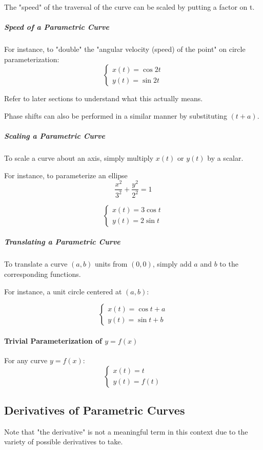 \documentclass{article}
\begin{document}
The "speed" of the traversal of the curve can be scaled by putting a factor on t.

\subparagraph{Speed of a Parametric Curve}
For instance, to "double" the "angular velocity (speed) of the point" on circle parameterization:
\[
    \begin{cases}
        x(t) = \cos 2t \\
        y(t) = \sin 2t
    \end{cases}
\]

Refer to later sections to understand what this actually means.

Phase shifts can also be performed in a similar manner by substituting $(t+a)$.

\subparagraph{Scaling a Parametric Curve}
To scale a curve about an axis, simply multiply $x(t)$ or $y(t)$ by a scalar.

For instance, to parameterize an ellipse
$$\frac{x^2}{3^2} + \frac{y^2}{2^2} = 1$$

\[
    \begin{cases}
        x(t) = 3 \cos t \\
        y(t) = 2 \sin t
    \end{cases}
\]

\subparagraph{Translating a Parametric Curve}
To translate a curve $(a,b)$ units from $(0,0)$, simply add $a$ and $b$ to the corresponding functions.

For instance, a unit circle centered at $(a,b)$:

\[
    \begin{cases}
        x(t) = \cos t + a \\
        y(t) = \sin t + b
    \end{cases}
\]

\paragraph{Trivial Parameterization of $y=f(x)$}
For any curve $y = f(x)$:
\[
    \begin{cases}
        x(t) = t \\
        y(t) = f(t)
    \end{cases}
\]

\subsection{Derivatives of Parametric Curves}
Note that "the derivative" is not a meaningful term in this context due to the variety of possible derivatives to take.
\end{document}
